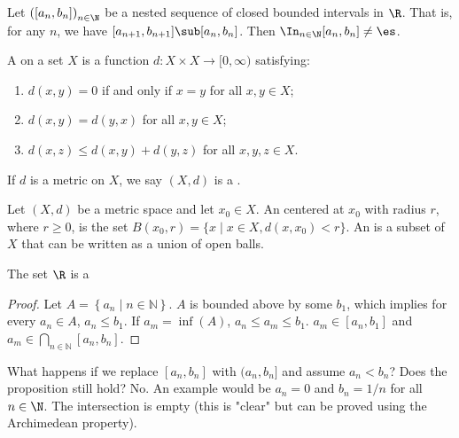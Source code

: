 \documentclass[10pt]{article}
\begin{document}

\begin{definition}
    
\end{definition}
\begin{proposition}
    Let ${([{a}_{n},{b}_{n}])}_{n\in\N}$ be a nested sequence of closed bounded intervals in $\R$. That is, for any $n$, we have $[{a}_{n+1},{b}_{n+1}]\sub[{a}_{n},{b}_{n}]$. Then ${\In}_{n\in\N}[{a}_{n},{b}_{n}]\ne\es$.
\end{proposition}
\begin{definition}
    A  on a set $X$ is a function $d:X\times X\to[0,\infty)$ satisfying:
    \begin{enumerate}
        \item $d(x,y)=0$ if and only if $x=y$ for all $x,y\in X$;
        \item $d(x,y)=d(y,x)$ for all $x,y\in X$;
        \item $d(x,z)\le d(x,y)+d(y,z)$ for all $x,y,z\in X$.
    \end{enumerate}
    If $d$ is a metric on $X$, we say $(X,d)$ is a .
\end{definition}
\begin{definition}
    Let $(X,d)$ be a metric space and let ${x}_{0}\in X$. An  centered at ${x}_{0}$ with radius $r$, where $r\ge 0$, is the set $B({x}_{0},r)=\{x\mid x\in X,d(x,{x}_{0})<r\}$. An  is a subset of $X$ that can be written as a union of open balls.
\end{definition}
\par
The set $\R$ is a 
\begin{proof}
    Let $A=\left \{ a_n\mid n\in \mathbb{N} \right \}$. $A$ is bounded above by some $b_1$, which implies for every $a_n\in A$, $a_n\leq b_1$. If ${a}_{m}=\inf(A)$, $a_n\leq a_m\leq b_1$. $a_m\in [a_n,b_1]$ and $a_m\in \bigcap_{n\in \mathbb{N}}^{} [a_n,b_n]$.
\end{proof}
\begin{remark}
    What happens if we replace $[a_n,b_n]$ with $(a_n,b_n]$ and assume $a_n<b_n$? Does the proposition still hold?
    {No}. An example would be $a_n=0$ and $b_n={1}/{n}$ for all $n\in\N$. The intersection is empty (this is "clear" but can be proved using the Archimedean property).
\end{remark}


\newpage
\end{document}
